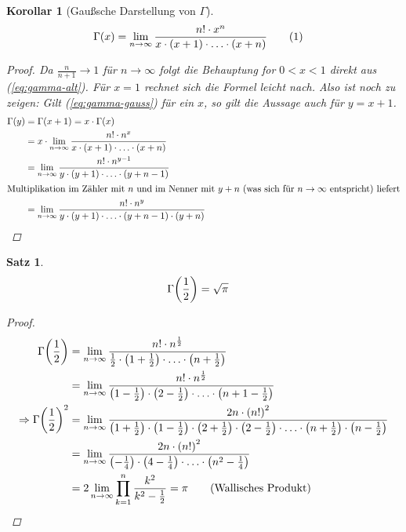 \documentclass[11pt, twoside, a4paper]{article}
\theoremstyle{plain}
\newtheorem{satz}[blockelement]{Satz}
\newtheorem{korollar}[blockelement]{Korollar}
\numberwithin{equation}{subsection}
\newcommand{\numberthis}[0]{\addtocounter{equation}{1}\tag{\theequation}}
\newcommand{\pair}[1]{\left(#1\right)}
\newcommand{\of}[1]{\mathopen{}\mathclose{}\bgroup\left(#1\aftergroup\egroup\right)}
\newcommand{\impl}[0]{\Rightarrow{}}
\newcommand{\fromto}{\rightarrow{}}
\newcommand{\ntoinf}[0]{n\fromto\infty}
\begin{document}
    \begin{korollar}[Gaußsche Darstellung von $\Gamma$] %
        \begin{align*}
            \Gamma\of{x} &= \lim_{\ntoinf} \frac{n!\cdot x^n}{x\cdot\pair{x+1}\cdot\ldots\cdot \pair{x+n}}\numberthis\label{eq:gamma-gauss}
        \end{align*}
        \begin{proof}
            Da $\frac{n}{n+1}\fromto 1$ für $\ntoinf$ folgt die Behauptung for $0 < x < 1$ direkt aus (\ref{eq:gamma-alt}). Für $x=1$ rechnet sich die Formel leicht nach.
            Also ist noch zu zeigen: Gilt (\ref{eq:gamma-gauss}) für ein $x$, so gilt die Aussage auch für $y=x+1$.
            \begin{align*}
                \Gamma\of{y} &=\Gamma\of{x+1} = x\cdot\Gamma\of{x}\\
                &= x \cdot \lim_{\ntoinf} \frac{n!\cdot n^x}{x\cdot\pair{x+1}\cdot\ldots\cdot\pair{x+n}}\\
                &= \lim_{\ntoinf} \frac{n!\cdot n^{y-1}}{y\cdot\pair{y+1}\cdot\ldots\cdot \pair{y+n-1}}\\
                \intertext{Multiplikation im Zähler mit $n$ und im Nenner mit $y+n$ (was sich für $\ntoinf$ entspricht) liefert}
                &= \lim_{\ntoinf} \frac{n!\cdot n^{y}}{y\cdot\pair{y+1}\cdot \ldots\cdot \pair{y+n-1}\cdot\pair{y+n}}\qedhere
            \end{align*}
        \end{proof}
    \end{korollar}

    \begin{satz} %
        \begin{align*}
            \Gamma\of{\frac{1}{2}} &= \sqrt {\pi}
        \end{align*}

        \begin{proof}
            \begin{align*}
                \Gamma\of{\frac{1}{2}} &= \lim_{\ntoinf} \frac{n!\cdot n^{\frac{1}{2}}}{\frac{1}{2}\cdot \pair{1+\frac{1}{2}}\cdot\ldots \cdot \pair{n+\frac{1}{2}}}\\
                &= \lim_{\ntoinf} \frac{n!\cdot n^{\frac{1}{2}}}{\pair{1-\frac{1}{2}}\cdot\pair{2-\frac{1}{2}}\cdot\ldots\cdot \pair{n+1-\frac{1}{2}}}\\
                \impl \Gamma\of{\frac{1}{2}}^{2} &= \lim_{\ntoinf} \frac{2n\cdot \pair{n!}^2}{\pair{1+\frac{1}{2}}\cdot \pair{1-\frac{1}{2}}\cdot\pair{2+\frac{1}{2}}\cdot\pair{2-\frac{1}{2}}\cdot\ldots\cdot \pair{n+\frac{1}{2}}\cdot \pair{n-\frac{1}{2}}}\\
                &= \lim_{\ntoinf} \frac{2n\cdot \pair{n!}^2}{\pair{-\frac{1}{4}}\cdot\pair{4-\frac{1}{4}}\cdot\ldots\cdot\pair{n^2-\frac{1}{4}}}\\
                &= 2\lim_{\ntoinf} \prod_{k=1}^{n} \frac{k^2}{k^2-\frac{1}{2}} = \pi\tag{Wallisches Produkt}
            \end{align*}
        \end{proof}
    \end{satz}
\end{document}
